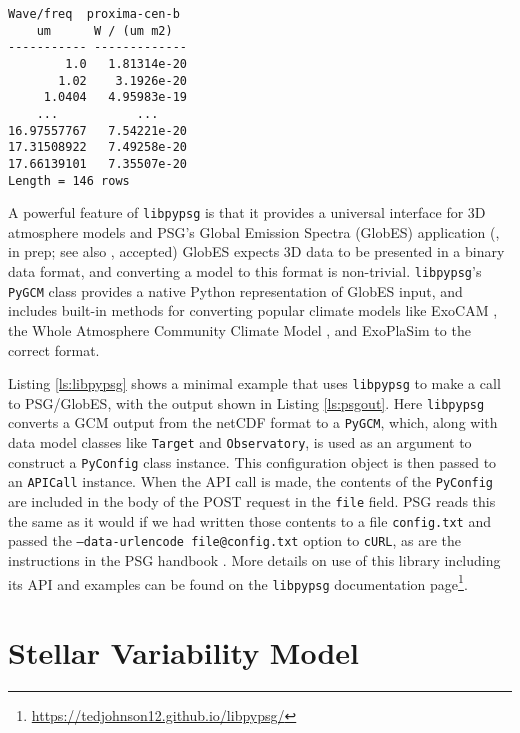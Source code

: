 \documentclass[linenumbers,preprint,authoryear]{elsarticle}
\newcommand{\urldocslibpypsg}{\url{https://tedjohnson12.github.io/libpypsg/}}
\begin{document}
\begin{lstlisting}[caption={\texttt{libpypsg} Example Output},label={ls:psgout}]
Wave/freq  proxima-cen-b
    um      W / (um m2) 
----------- -------------
        1.0   1.81314e-20
       1.02    3.1926e-20
     1.0404   4.95983e-19
    ...           ...
16.97557767   7.54221e-20
17.31508922   7.49258e-20
17.66139101   7.35507e-20
Length = 146 rows

\end{lstlisting}



A powerful feature of \texttt{libpypsg} is that it provides a universal interface for 3D atmosphere models and PSG's Global Emission Spectra (GlobES) application (\citealt{fauchez2024}, in prep; see also \citealt{kofman2024}, accepted)
GlobES expects 3D data to be presented in a binary data format, and converting a model to this format is non-trivial. \texttt{libpypsg}'s \texttt{PyGCM} class provides a native Python representation of GlobES input, and includes built-in methods for converting popular climate models like ExoCAM \citep{wolf2022}, the Whole Atmosphere Community Climate Model \citep[WACCM,][]{marsh2013}, and ExoPlaSim \citep{paradise2022} to the correct format.

Listing \ref{ls:libpypsg} shows a minimal example that uses \texttt{libpypsg} to make a call to PSG/GlobES, with the output shown in Listing \ref{ls:psgout}. Here \texttt{libpypsg} converts a GCM output from the netCDF format to a \texttt{PyGCM}, which, along with data model classes like \texttt{Target} and \texttt{Observatory}, is used as an argument to construct a \texttt{PyConfig} class instance. This configuration object is then passed to an \texttt{APICall} instance. When the API call is made, the contents of the \texttt{PyConfig} are included in the body of the POST request in the \texttt{file} field. PSG reads this the same as it would if we had written those contents to a file \texttt{config.txt} and passed the \texttt{--data-urlencode file@config.txt} option to \texttt{cURL}, as are the instructions in the PSG handbook \citep[pp. 162-163]{villanueva2022}. More details on use of this library including its API and examples can be found on the \texttt{libpypsg} documentation page\footnote{\urldocslibpypsg}.


\section{Stellar Variability Model}
\label{sec:star}
\end{document}
